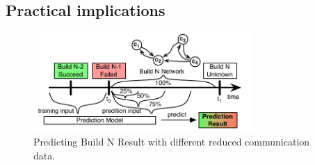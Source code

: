 \documentclass[12pt,oneside]{book}
\begin{document}
\subsection{Practical implications}
\label{subsec:practicalimpl}

\begin{figure}[t]
\begin{center}
\includegraphics[width=8.4cm]{figures/ReducedCommunicationInput}
\caption{Predicting Build N Result with different reduced communication
data.}
\label{fig:ReducedCommunicationInput}
\end{center}
\end{figure}



\end{document}
